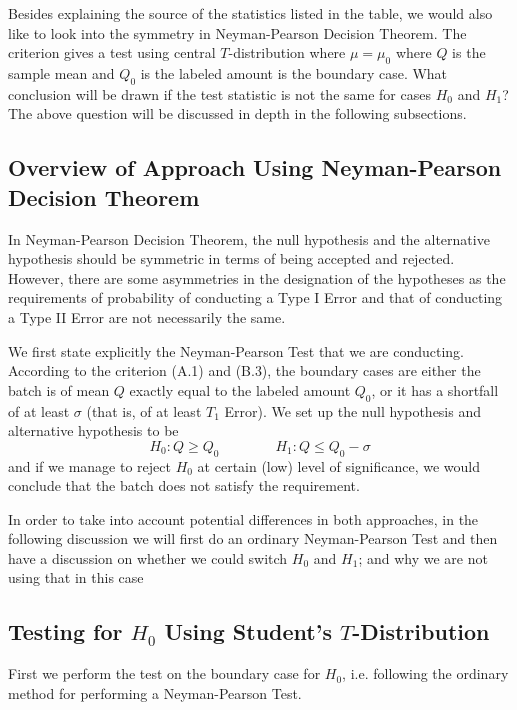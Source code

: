 \documentclass[12pt]{article}
\begin{document}
Besides explaining the source of the statistics listed in the table, we would also like to look into the symmetry in Neyman-Pearson Decision Theorem. The criterion gives a test using central $T$-distribution where $\mu=\mu_0$ where $Q$ is the sample mean and $Q_0$ is the labeled amount is the boundary case. What conclusion will be drawn if the test statistic is not the same for cases $H_0$ and $H_1$? The above question will be discussed in depth in the following subsections.

\subsection{Overview of Approach Using Neyman-Pearson Decision Theorem}

In Neyman-Pearson Decision Theorem, the null hypothesis and the alternative hypothesis should be symmetric in terms of being accepted and rejected. However, there are some asymmetries in the designation of the hypotheses as the requirements of probability of conducting a Type I Error and that of conducting a Type II Error are not necessarily the same. 

We first state explicitly the Neyman-Pearson Test that we are conducting. According to the criterion (A.1) and (B.3), the boundary cases are either the batch is of mean $Q$ exactly equal to the labeled amount $Q_0$, or it has a shortfall of at least $\sigma$ (that is, of at least $T_1$ Error). We set up the null hypothesis and alternative hypothesis to be
\begin{equation}\label{hypothesis1}    
    H_0 : Q\geq Q_0 \quad\quad\quad\quad H_1 : Q\leq Q_0 - \sigma
\end{equation}
and if we manage to reject $H_0$ at certain (low) level of significance, we would conclude that the batch does not satisfy the requirement. 

In order to take into account potential differences in both approaches, in the following discussion we will first do an ordinary Neyman-Pearson Test and then have a discussion on whether we could switch $H_0$ and $H_1$; and why we are not using that in this case

\subsection{Testing for $H_0$ Using Student's $T$-Distribution}

First we perform the test on the boundary case for $H_0$, i.e. following the ordinary method for performing a Neyman-Pearson Test. 
\end{document}

